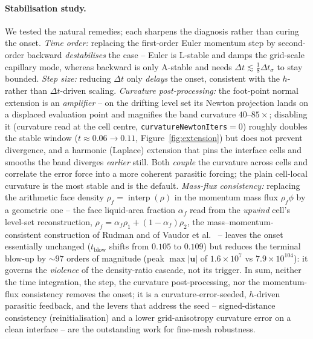 \documentclass[preprint,3p,11pt]{elsarticle}
\newcommand{\uvec}{\mathbf{u}}
\begin{document}
\paragraph{Stabilisation study.} We tested the natural remedies; each sharpens the diagnosis rather
than curing the onset. \emph{Time order:} replacing the first-order Euler momentum step by
second-order backward \emph{destabilises} the case -- Euler is L-stable and damps the grid-scale
capillary mode, whereas backward is only A-stable and needs $\Delta t\lesssim\tfrac18\Delta t_\sigma$
to stay bounded. \emph{Step size:} reducing $\Delta t$ only \emph{delays} the onset, consistent with
the $h$- rather than $\Delta t$-driven scaling. \emph{Curvature post-processing:} the foot-point
normal extension is an \emph{amplifier} -- on the drifting level set its Newton projection lands on a
displaced evaluation point and magnifies the band curvature $40$--$85\times$; disabling it (curvature
read at the cell centre, \texttt{curvatureNewtonIters}$=0$) roughly doubles the stable window
($t\approx0.06\to0.11$, Figure~\ref{fig:extension}) but does not prevent divergence, and a harmonic
(Laplace) extension that pins the interface cells and smooths the band diverges \emph{earlier} still.
Both \emph{couple} the curvature across cells and correlate the error force into a more coherent
parasitic forcing; the plain cell-local curvature is the most stable and is the default.
\emph{Mass-flux consistency:} replacing the arithmetic face density
$\rho_f=\operatorname{interp}(\rho)$ in the momentum mass flux $\rho_f\phi$ by a geometric one -- the
face liquid-area fraction $\alpha_f$ read from the \emph{upwind} cell's level-set reconstruction,
$\rho_f=\alpha_f\rho_1+(1-\alpha_f)\rho_2$, the mass--momentum-consistent construction of Rudman and of
Vaudor et al.~\cite{rudman1998,vaudor2017} -- leaves the onset essentially unchanged
($t_{\mathrm{blow}}$ shifts from $0.105$ to $0.109$) but reduces the terminal blow-up by $\sim\!97$
orders of magnitude (peak $\max\lvert\uvec\rvert$ of $1.6\times10^{7}$ vs $7.9\times10^{104}$): it
governs the \emph{violence} of the density-ratio cascade, not its trigger. In sum, neither the time
integration, the step, the curvature post-processing, nor the momentum-flux consistency removes the
onset; it is a curvature-error-seeded, $h$-driven parasitic feedback, and the levers that address the
seed -- signed-distance consistency (reinitialisation) and a lower grid-anisotropy curvature error on a
clean interface -- are the outstanding work for fine-mesh robustness.
\end{document}
